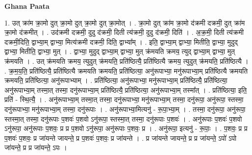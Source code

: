 \documentclass[17pt]{extarticle}
\begin{document}
\textbf{Ghana Paata } \newline

1. उत् क्रा॑म क्रा॒मो दुत् क्रा॒मो दुत् क्रा॒मो दुत् क्रा॒मोत् । . क्रा॒मो दुत् क्रा॑म क्रा॒मो द॑क्रमी दक्रमी॒ दुत् क्रा॑म क्रा॒मो द॑क्रमीत् । . उद॑क्रमी दक्रमी॒ दुदु द॑क्रमी॒ दिती त्य॑क्रमी॒ दुदु द॑क्रमी॒ दिति॑ । . अ॒क्र॒मी॒ दिती त्य॑क्रमी दक्रमी॒दिति॒ द्वाभ्या॒म् द्वाभ्या॒ मित्य॑क्रमी दक्रमी॒ दिति॒ द्वाभ्या᳚म् । . इति॒ द्वाभ्या॒म् द्वाभ्या॒ मितीति॒ द्वाभ्या॒ मुदुद् द्वाभ्या॒ मितीति॒ द्वाभ्या॒ मुत् । . द्वाभ्या॒ मुदुद् द्वाभ्या॒म् द्वाभ्या॒ मुत् क्र॑मयति क्रमय॒ त्युद् द्वाभ्या॒म् द्वाभ्या॒ मुत् क्र॑मयति । . उत् क्र॑मयति क्रमय॒ त्युदुत् क्र॑मयति॒ प्रति॑ष्ठित्यै॒ प्रति॑ष्ठित्यै क्रमय॒ त्युदुत् क्र॑मयति॒ प्रति॑ष्ठित्यै । . क्र॒म॒य॒ति॒ प्रति॑ष्ठित्यै॒ प्रति॑ष्ठित्यै क्रमयति क्रमयति॒ प्रति॑ष्ठित्या॒ अनु॑रूपाभ्या॒ मनु॑रूपाभ्या॒म् प्रति॑ष्ठित्यै क्रमयति क्रमयति॒ प्रति॑ष्ठित्या॒ अनु॑रूपाभ्याम् । . प्रति॑ष्ठित्या॒ अनु॑रूपाभ्या॒ मनु॑रूपाभ्या॒म् प्रति॑ष्ठित्यै॒ प्रति॑ष्ठित्या॒ अनु॑रूपाभ्या॒म् तस्मा॒त् तस्मा॒ दनु॑रूपाभ्या॒म् प्रति॑ष्ठित्यै॒ प्रति॑ष्ठित्या॒ अनु॑रूपाभ्या॒म् तस्मा᳚त् । . प्रति॑ष्ठित्या॒ इति॒ प्रति॑ - स्थि॒त्यै॒ । . अनु॑रूपाभ्या॒म् तस्मा॒त् तस्मा॒ दनु॑रूपाभ्या॒ मनु॑रूपाभ्या॒म् तस्मा॒ दनु॑रूपा॒ अनु॑रूपा॒ स्तस्मा॒ दनु॑रूपाभ्या॒ मनु॑रूपाभ्या॒म् तस्मा॒ दनु॑रूपाः । . अनु॑रूपाभ्या॒मित्यनु॑ - रू॒पा॒भ्या॒म् । . तस्मा॒ दनु॑रूपा॒ अनु॑रूपा॒ स्तस्मा॒त् तस्मा॒ दनु॑रूपाः प॒शवः॑ प॒शवो ऽनु॑रूपा॒ स्तस्मा॒त् तस्मा॒ दनु॑रूपाः प॒शवः॑ । . अनु॑रूपाः प॒शवः॑ प॒शवो ऽनु॑रूपा॒ अनु॑रूपाः प॒शवः॒ प्र प्र प॒शवो ऽनु॑रूपा॒ अनु॑रूपाः प॒शवः॒ प्र । . अनु॑रूपा॒ इत्यनु॑ - रू॒पाः॒ । . प॒शवः॒ प्र प्र प॒शवः॑ प॒शवः॒ प्र जा॑यन्ते जायन्ते॒ प्र प॒शवः॑ प॒शवः॒ प्र जा॑यन्ते । . प्र जा॑यन्ते जायन्ते॒ प्र प्र जा॑यन्ते॒ ऽपो॑ ऽपो जा॑यन्ते॒ प्र प्र जा॑यन्ते॒ ऽपः । \newline
\end{document}
